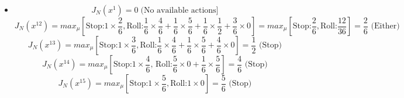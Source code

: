 \documentclass[11pt]{article}
\newenvironment{problem}[2][Problem]{\begin{trivlist}
\item[\hskip \labelsep {\bfseries #1}\hskip \labelsep {\bfseries #2.}]}{\end{trivlist}}
\begin{document}
\begin{problem}{4}
\begin{itemize}
		
		
		
		\item[Roll 4]
		\begin{equation}
			J_N(x^1) = 0 \; \text{(No available actions]}
		\end{equation}
		\begin{equation}
			J_N(x^{12}) = max_{\mu} \left[ \text{Stop:} 1 \times \frac{2}{6}, \text{Roll:} \frac{1}{6} \times \frac{4}{6} + \frac{1}{6} \times \frac{5}{6} + \frac{1}{6} \times \frac{1}{2} + \frac{3}{6} \times 0 \right] = max_{\mu} \left[ \text{Stop:} \frac{2}{6}, \text{Roll:} \frac{12}{36}\right] = \frac{2}{6} \text{ (Either)}
		\end{equation}
		\begin{equation}
			J_N(x^{13}) = max_{\mu} \left[ \text{Stop:} 1 \times \frac{3}{6}, \text{Roll:} \frac{1}{6} \times \frac{4}{6} + \frac{1}{6} \times \frac{5}{6} + \frac{4}{6} \times 0 \right] = \frac{1}{2} \text{ (Stop)}
		\end{equation}
		\begin{equation}
			J_N(x^{14}) = max_{\mu} \left[ \text{Stop:} 1 \times \frac{4}{6} \text{, Roll:} \frac{5}{6} \times 0 + \frac{1}{6} \times \frac{5}{6}\right] = \frac{4}{6} \text{ (Stop)}
		\end{equation}
		\begin{equation}
			J_N(x^{15}) = max_{\mu} \left[ \text{Stop:} 1 \times \frac{5}{6}, \text{Roll:} 1 \times 0 \right] = \frac{5}{6} \text{ (Stop)}
		\end{equation}
		
		
		

\end{itemize}
\end{problem}
\end{document}
